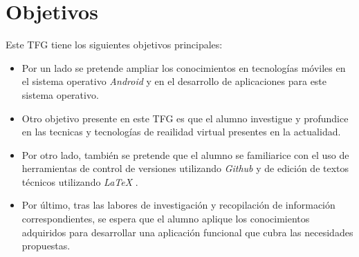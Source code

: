 %
%
%
%


\chapter{Objetivos} \label{chap:Objetivos}  

Este TFG tiene los siguientes objetivos principales:

	
\begin{itemize}
\item  	Por un lado se pretende ampliar los conocimientos en tecnologías móviles en el sistema operativo \textit{Android} \cite{URL::Android} y en el desarrollo de aplicaciones para este sistema operativo.
\item   Otro objetivo presente en este TFG es que el alumno investigue y profundice en las tecnicas y tecnologías de reailidad virtual presentes en la actualidad.
\item   Por otro lado, también se pretende que el alumno se familiarice con el uso de herramientas de control de versiones utilizando \textit{Github} \cite{URL::Github} y de edición de textos técnicos utilizando \textit{LaTeX}  \cite{URL::LaTeX}.
\item   Por último, tras las labores de investigación y recopilación de información correspondientes, se espera que el alumno aplique los conocimientos adquiridos para desarrollar una aplicación funcional que cubra las necesidades propuestas.
\end{itemize}